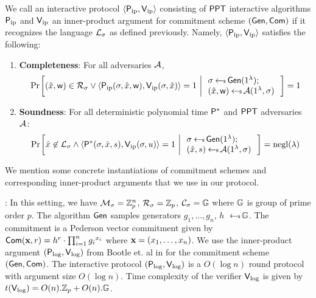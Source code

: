 \begin{definition}\label{defn:innerproductarg}
We call an interactive protocol $\langle \mathsf{P}_\mathrm{ip},\mathsf{V}_\mathrm{ip}\rangle$ consisting of $\mathsf{PPT}$ interactive algorithms $\mathsf{P}_\mathrm{ip}$ and $\mathsf{V}_\mathrm{ip}$ an inner-product argument for commitment scheme $(\mathsf{Gen},\mathsf{Com})$ if it recognizes the language $\mathcal{L}_\sigma$ as defined previously. Namely, $\langle \mathsf{P}_\mathrm{ip},\mathsf{V}_\mathrm{ip}\rangle$ satisfies the following: 
\begin{enumerate}[{\rm (i)}]
\item {\bf Completeness}: For all adversaries $\mathcal{A}$,
\begin{align*}
\condprob{(\stmt,\wit)\in \calR_\sigma \vee \langle \pip(\sigma,\stmt,\wit),\vip(\sigma,\stmt)\rangle=1}{
\begin{array}{l}
\sigma\sample \gen(\secparam);\\
(\stmt,\wit)\sample \adv(\secparam,\sigma)
\end{array}
}=1
\end{align*}

\item{\bf Soundness}: For all deterministic polynomial time $\mathsf{P}^*$ and $\mathsf{PPT}$ adversaries $\mathcal{A}$:
\begin{align*}
\condprob{\stmt\not\in \calL_\sigma \wedge \langle
\prover^*(\sigma,\stmt,s),\vip(\sigma,u)\rangle=1}{
\begin{array}{l}
\sigma\sample \gen(\secparam);\\
(\stmt,s)\sample \adv(\secparam,\sigma)
\end{array}
} = \negl(\lambda)
\end{align*}
\end{enumerate}

\end{definition}

We mention some concrete instantiations of  commitment schemes and corresponding inner-product arguments that we use in our protocol.

: In this setting, we have $\mathcal{M}_\sigma=\mathbb{Z}^n_p$, $\mathcal{R}_\sigma=\mathbb{Z}_p$, $\mathcal{C}_\sigma=\mathbb{G}$ where $\mathbb{G}$ is group of prime order $p$. The algorithm $\mathsf{Gen}$ samples generators $g_1,\ldots,g_n$, $h$ $\hskip2.3pt{\gets\!\!\mbox{\tiny${\$}$\normalsize}}\, \mathbb{G}$. The commitment is a Pederson vector commitment given by $\mathsf{Com}({\bf x } ,r ) = h^r \cdot \prod_{i=1}^n {g_i}^{x_i}$ where ${\bf x}=(x_1,\ldots,x_n)$. We use the inner-product argument $(\mathsf{P}_\mathrm{log},\mathsf{V}_\mathrm{log})$ from Bootle et. al in \cite{bulletproofs} for the commitment scheme $(\mathsf{Gen},\mathsf{Com})$. The interactive protocol $(\mathsf{P}_\mathrm{log},\mathsf{V}_\mathrm{log})$ is a $O(\log n)$ round protocol with argument size $O(\log n)$. Time complexity of the verifier $\mathsf{V}_\mathrm{log}$ is given by $t(\mathsf{V}_\mathrm{log})=O(n).\mathbb{Z}_p + O(n).\mathbb{G}$.\smallskip


